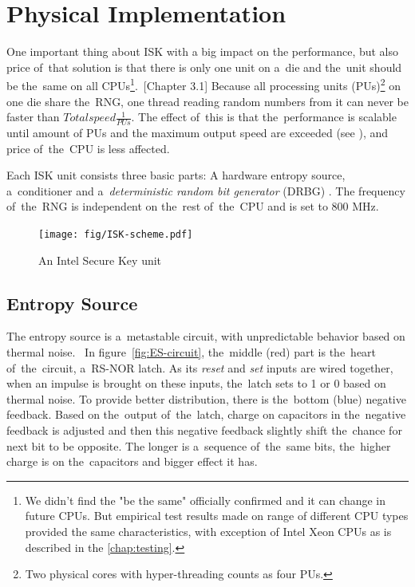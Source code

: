 \section{Physical Implementation}\label{sec:ISK-physical}
\par{
One important thing about ISK with a big impact on the performance, but also price 
of~that solution is that there is only one unit on a~die and the~unit should be
 the~same on all CPUs\footnote{We didn't find the "be the same" officially confirmed and it can change in future CPUs. But empirical test results made on range of different CPU types provided the same characteristics, with exception of Intel Xeon CPUs as is described in the \ref{chap:testing}.}.~\cite{IntelDRNGGuide}[Chapter 3.1]
Because all processing units (PUs)\footnote{Two physical cores with 
hyper-threading counts as four PUs.} on one die share the~RNG, one thread 
reading random numbers from it can never be faster than 
$Total speed  \frac{1}{PUs}$. The effect of~this is that the~performance is
 scalable until amount of PUs and the maximum output speed are exceeded 
 (see ), and price of~the~CPU is less 
 affected.
}

\par{
Each ISK unit consists three basic parts: A hardware entropy source, 
a~conditioner and a~{\em deterministic random bit generator} (DRBG)
\cite{IntelDRNGGuide}. The frequency of~the~RNG is independent 
on the~rest of~the~CPU and is set to 800 MHz. 
}
\begin{figure}[h!]
  \centering
 \texttt{[image: fig/ISK-scheme.pdf]} %
\caption{An Intel Secure Key unit}
\label{fig:ISK-unit}
\end{figure}


\subsection{Entropy Source}
\par{
The entropy source is a~metastable circuit, with unpredictable behavior based 
on thermal noise.~\cite{UnderstandingRdRandElectronic}
In figure~\ref{fig:ES-circuit}, the~middle (red) part is the~heart 
of~the~circuit, a~RS-NOR latch. As its {\em reset} and {\em set} inputs 
are wired together, when an impulse is brought on these inputs, the~latch sets 
to 1 or 0 based on thermal noise. To provide better distribution, there is 
the~bottom (blue) negative feedback. Based on the~output of~the~latch, charge 
on capacitors in the~negative feedback is adjusted and then this negative 
feedback slightly shift the~chance for next bit to be opposite. The longer 
is a~sequence of~the~same bits, the~higher charge is on the~capacitors 
and bigger effect it has.
}

